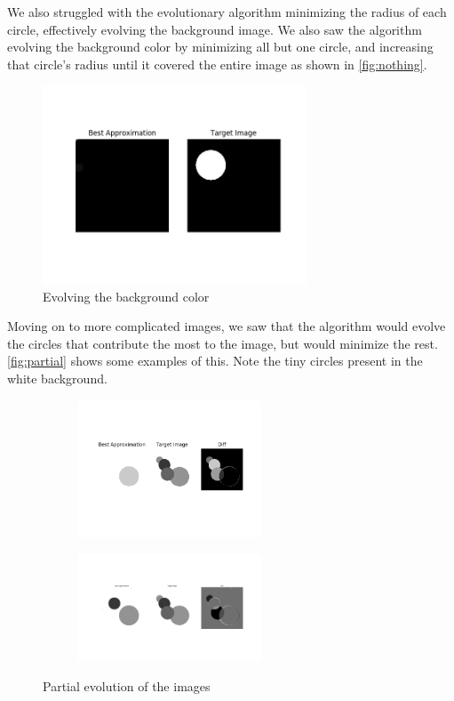 \documentclass{article}
\begin{document}
We also struggled with the evolutionary algorithm minimizing the radius of each circle, effectively evolving the background image. We also saw the algorithm evolving the background color by minimizing all but one circle, and increasing that circle's radius until it covered the entire image as shown in \autoref{fig:nothing}.

\begin{figure}[H]
    \centering
    \includegraphics[width=0.7\textwidth]{output/evolve_nothing.png}
    \caption{Evolving the background color}\label{fig:nothing}
\end{figure}

Moving on to more complicated images, we saw that the algorithm would evolve the circles that contribute the most to the image, but would minimize the rest. \autoref{fig:partial} shows some examples of this. Note the tiny circles present in the white background.

\begin{figure}[H]
    \centering
    \begin{subfigure}[b]{\textwidth}
        \centering
        \includegraphics[width=0.6\textwidth]{output/evolve_one.png}
    \end{subfigure}
    \begin{subfigure}[b]{\textwidth}
        \centering
        \includegraphics[width=0.6\textwidth]{output/evolve_some.png}
    \end{subfigure}
    \caption{Partial evolution of the images}\label{fig:partial}
\end{figure}
\end{document}
